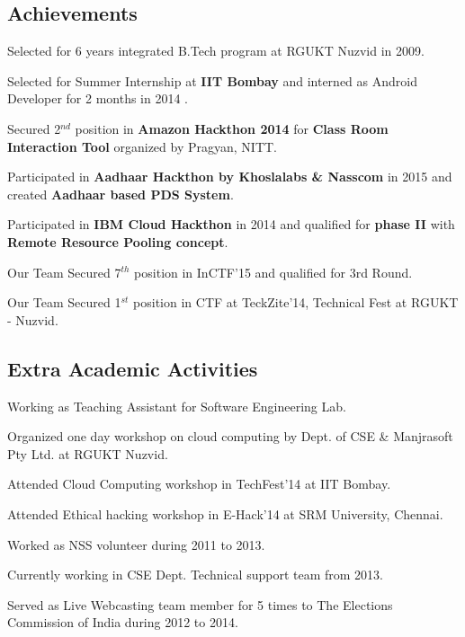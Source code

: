 \documentclass[10pt]{article}
\begin{document}
\subsection*{Achievements }
\onehalfspacing
\begin{compactitem}
	\item Selected for 6 years integrated B.Tech program at RGUKT Nuzvid in 2009.
	\item Selected for Summer Internship at \textbf{IIT Bombay} and interned as Android Developer for 2 months in 2014 .
	\item Secured 2$ ^{nd} $ position in \textbf{Amazon Hackthon 2014} for \textbf{Class Room Interaction Tool} organized by Pragyan, NITT.
	\item Participated in \textbf{Aadhaar Hackthon by Khoslalabs \& Nasscom} in 2015 and created \textbf{Aadhaar based PDS System}.
	\item Participated in \textbf{IBM Cloud Hackthon} in 2014 and qualified for \textbf{phase II} with \textbf{Remote Resource Pooling concept}.
	\item Our Team Secured 7$^{th}$ position in InCTF'15 and qualified for 3rd Round.
	\item Our Team Secured 1$^{st}$ position in CTF at TeckZite'14, Technical Fest at RGUKT - Nuzvid.
\end{compactitem}

\subsection*{Extra Academic Activities}
\onehalfspacing
\begin{compactitem}
	\item Working as Teaching Assistant for Software Engineering Lab.
	\item Organized one day workshop on cloud computing by Dept. of CSE \& Manjrasoft Pty Ltd. at RGUKT Nuzvid.
	\item Attended Cloud Computing workshop in TechFest'14 at IIT Bombay. 
	\item Attended Ethical hacking workshop in E-Hack'14 at SRM University, Chennai.
	\item Worked as NSS volunteer during 2011 to 2013.
	\item Currently working in CSE Dept. Technical support team from 2013. 
	\item Served as Live Webcasting team member for 5 times to The Elections Commission of India during 2012 to 2014.
\end{compactitem}
\end{document}
